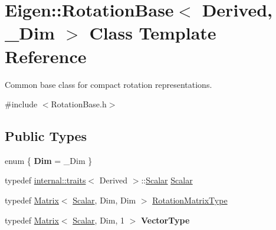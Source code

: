 \hypertarget{class_eigen_1_1_rotation_base}{}\section{Eigen\+::Rotation\+Base$<$ Derived, \+\_\+\+Dim $>$ Class Template Reference}
\label{class_eigen_1_1_rotation_base}


Common base class for compact rotation representations.  




{\ttfamily \#include $<$Rotation\+Base.\+h$>$}

\subsection*{Public Types}
\begin{DoxyCompactItemize}
\item 
\mbox{\label{class_eigen_1_1_rotation_base_aa26a9dc8430e5b982eed294a8e5fa7c0}} 
enum \{ {\bfseries Dim} = \+\_\+\+Dim
 \}
\item 
typedef \mbox{\hyperlink{struct_eigen_1_1internal_1_1traits}{internal\+::traits}}$<$ Derived $>$\+::\mbox{\hyperlink{class_eigen_1_1_rotation_base_af9b43eac462d7aa70b018efd49c13ef4}{Scalar}} \mbox{\hyperlink{class_eigen_1_1_rotation_base_af9b43eac462d7aa70b018efd49c13ef4}{Scalar}}
\item 
typedef \mbox{\hyperlink{class_eigen_1_1_matrix}{Matrix}}$<$ \mbox{\hyperlink{class_eigen_1_1_rotation_base_af9b43eac462d7aa70b018efd49c13ef4}{Scalar}}, Dim, Dim $>$ \mbox{\hyperlink{class_eigen_1_1_rotation_base_a83602509674c9d635551998460342951}{Rotation\+Matrix\+Type}}
\item 
\mbox{\label{class_eigen_1_1_rotation_base_abb59e1e7143c7ee1f753299407dc3eda}} 
typedef \mbox{\hyperlink{class_eigen_1_1_matrix}{Matrix}}$<$ \mbox{\hyperlink{class_eigen_1_1_rotation_base_af9b43eac462d7aa70b018efd49c13ef4}{Scalar}}, Dim, 1 $>$ {\bfseries Vector\+Type}
\end{DoxyCompactItemize}
